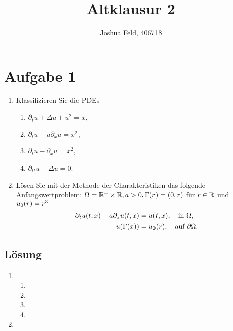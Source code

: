 \documentclass{exercise}
\institute{Applied and Computational Mathematics}
\title{Altklausur 2}
\author{Joshua Feld, 406718}
\begin{document}
    \maketitle


    \section*{Aufgabe 1}

    \begin{problem}
        \begin{enumerate}
            \item Klassifizieren Sie die PDEs
            \begin{enumerate}
                \item \(\partial_t u + \Delta u + u^2 = x\),
                \item \(\partial_t u - u\partial_x u = x^2\),
                \item \(\partial_t u - \partial_x u = x^2\),
                \item \(\partial_{tt}u - \Delta u = 0\).
            \end{enumerate}
            \item Lösen Sie mit der Methode der Charakteristiken das folgende Anfangswertproblem: \(\Omega = \R^+ \times \R, a > 0, \Gamma\parentheses*{r} = \parentheses*{0, r}\) für \(r \in \mathbb{R}\) und \(u_0\parentheses*{r} = r^3\)
            \begin{align*}
                \partial_t u\parentheses*{t, x} + a\partial_x u\parentheses*{t, x} &= u\parentheses*{t, x}, \quad \text{in }\Omega,\\
                u\parentheses*{\Gamma\parentheses*{x}} &= u_0\parentheses*{r}, \quad \text{auf }\partial\Omega.
            \end{align*}
        \end{enumerate}
    \end{problem}

    \subsection*{Lösung}
    \begin{enumerate}
        \item
        \begin{enumerate}
            \item
            \item
            \item
            \item
        \end{enumerate}
        \item
    \end{enumerate}
\end{document}
